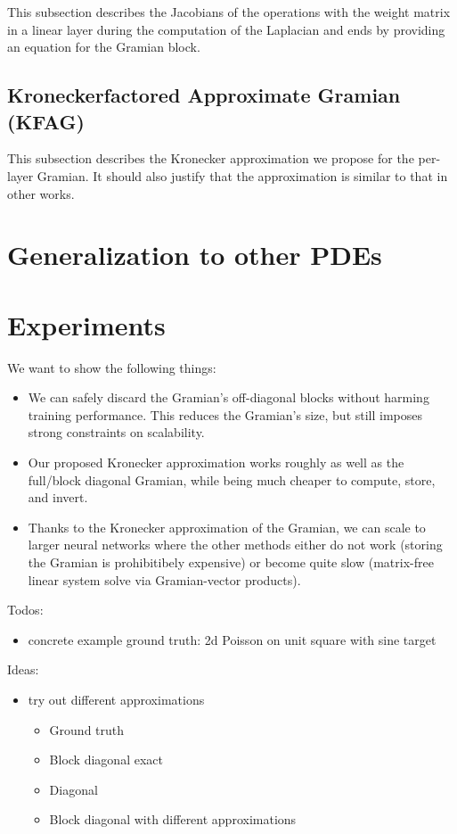 \documentclass{article}
\begin{document}
This subsection describes the Jacobians of the operations with the weight matrix in
a linear layer during the computation of the Laplacian and ends by providing an
equation for the Gramian block.

\subsection{Kroneckerfactored Approximate Gramian (KFAG)}

This subsection describes the Kronecker approximation we propose for the per-layer Gramian.
It should also justify that the approximation is similar to that in other works.

\section{Generalization to other PDEs}



\section{Experiments}

We want to show the following things:
\begin{itemize}
\item We can safely discard the Gramian's off-diagonal blocks without harming
  training performance. This reduces the Gramian's size, but still imposes
  strong constraints on scalability.

\item Our proposed Kronecker approximation works roughly as well as the
  full/block diagonal Gramian, while being much cheaper to compute, store, and
  invert.

\item Thanks to the Kronecker approximation of the Gramian, we can scale to larger neural networks where the other methods either do not work (storing the Gramian is prohibitibely expensive) or become quite slow (matrix-free linear system solve via Gramian-vector products).
\end{itemize}

Todos:
\begin{itemize}
\item concrete example ground truth: 2d Poisson on unit square with sine target
\end{itemize}

Ideas:
\begin{itemize}
\item try out different approximations
  \begin{itemize}
  \item Ground truth
  \item Block diagonal exact
  \item Diagonal
  \item Block diagonal with different approximations
  \end{itemize}
\end{itemize}
\end{document}
